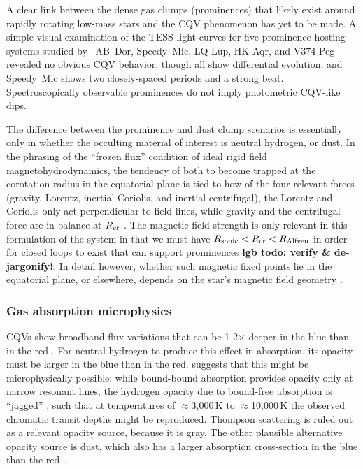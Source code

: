 \documentclass[11pt,twocolumn,tighten]{aastex63}
\begin{document}
A clear link between the dense gas clumps (prominences) that likely
exist around rapidly rotating low-mass stars and the CQV phenomenon
has yet to be made.  A simple visual examination of the TESS light
curves for five prominence-hosting systems studied by
\citet{2019MNRAS.482.2853J}--AB~Dor, Speedy~Mic, LQ Lup, HK Aqr, and
V374 Peg--revealed no obvious CQV behavior, though all show
differential evolution, and Speedy~Mic shows two closely-spaced
periods and a strong beat.  Spectroscopically observable prominences
do not imply photometric CQV-like dips.


The difference between the prominence and dust clump scenarios is
essentially only in whether the occulting material of interest is
neutral hydrogen, or dust.  In the phrasing of the ``frozen flux''
condition of ideal rigid field magnetohydrodynamics, the tendency of
both to become trapped at the corotation radius in the equatorial
plane is tied to how of the four relevant forces (gravity, Lorentz,
inertial Coriolis, and inertial centrifugal), the Lorentz and Coriolis
only act perpendicular to field lines, while gravity and the
centrifugal force are in balance at $R_{\rm cr}$
\citep[see][Sec.~2]{2005MNRAS.357..251T}.  The magnetic field strength
is only relevant in this formulation of the system in that we must
have $R_{\rm sonic} < R_{\rm cr} < R_{\rm Alfven}$ in order for closed
loops to exist that can support prominences
\citep{2019MNRAS.482.2853J} {\bf lgb todo: verify \& de-jargonify!}.
In detail however, whether such magnetic fixed points lie in the
equatorial plane, or elsewhere, depends on the star's magnetic field
geometry \citep{2023MNRAS.518.4734S}.


\subsubsection{Gas absorption microphysics}

CQVs show broadband flux variations that can be 1-2$\times$ deeper in
the blue than in the red
\citep{2020AJ....160...86B,2022AJ....163..144G,2023MNRAS.518.2921K}.
For neutral hydrogen to produce this effect in absorption, its opacity
must be larger in the blue than in the red.
\citet{1992oasp.book.....G} suggests that this might be
microphysically possible: while bound-bound absorption provides
opacity only at narrow resonant lines, the hydrogen opacity due to
bound-free absorption is ``jagged'' \citep[see][Figure 8.5 and
Eq.~8.8]{1992oasp.book.....G}, such that at temperatures of
$\approx$3{,}000\,K to $\approx$10{,}000\,K the observed chromatic
transit depths might be reproduced.  Thompson scattering is ruled out
as a relevant opacity source, because it is gray.  The other plausible
alternative opacity source is dust, which also has a larger absorption
cross-section in the blue than the red \citep{1989ApJ...345..245C}.
\end{document}
